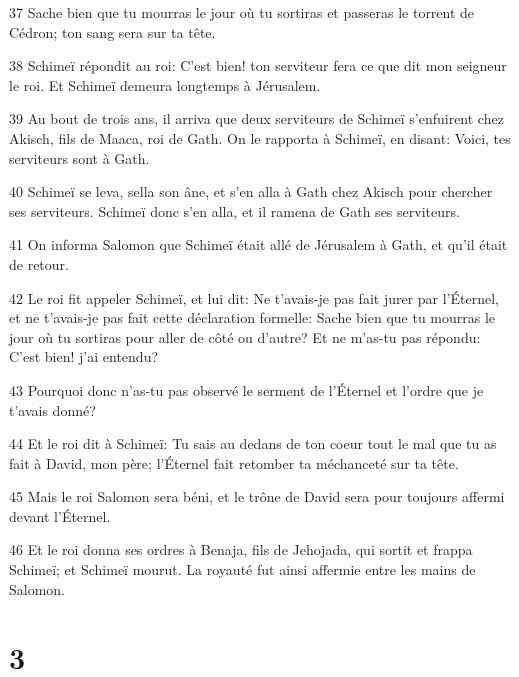 \par 37 Sache bien que tu mourras le jour où tu sortiras et passeras le torrent de Cédron; ton sang sera sur ta tête.
\par 38 Schimeï répondit au roi: C'est bien! ton serviteur fera ce que dit mon seigneur le roi. Et Schimeï demeura longtemps à Jérusalem.
\par 39 Au bout de trois ans, il arriva que deux serviteurs de Schimeï s'enfuirent chez Akisch, fils de Maaca, roi de Gath. On le rapporta à Schimeï, en disant: Voici, tes serviteurs sont à Gath.
\par 40 Schimeï se leva, sella son âne, et s'en alla à Gath chez Akisch pour chercher ses serviteurs. Schimeï donc s'en alla, et il ramena de Gath ses serviteurs.
\par 41 On informa Salomon que Schimeï était allé de Jérusalem à Gath, et qu'il était de retour.
\par 42 Le roi fit appeler Schimeï, et lui dit: Ne t'avais-je pas fait jurer par l'Éternel, et ne t'avais-je pas fait cette déclaration formelle: Sache bien que tu mourras le jour où tu sortiras pour aller de côté ou d'autre? Et ne m'as-tu pas répondu: C'est bien! j'ai entendu?
\par 43 Pourquoi donc n'as-tu pas observé le serment de l'Éternel et l'ordre que je t'avais donné?
\par 44 Et le roi dit à Schimeï: Tu sais au dedans de ton coeur tout le mal que tu as fait à David, mon père; l'Éternel fait retomber ta méchanceté sur ta tête.
\par 45 Mais le roi Salomon sera béni, et le trône de David sera pour toujours affermi devant l'Éternel.
\par 46 Et le roi donna ses ordres à Benaja, fils de Jehojada, qui sortit et frappa Schimeï; et Schimeï mourut. La royauté fut ainsi affermie entre les mains de Salomon.

\chapter{3}

